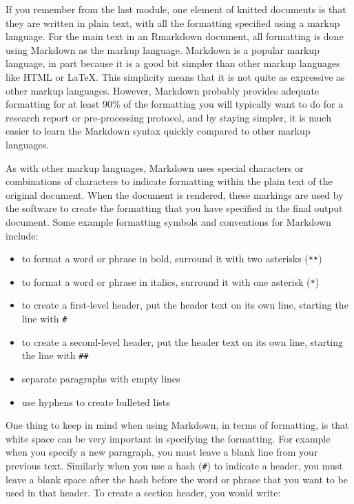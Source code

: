 \documentclass[]{tufte-book}
\providecommand{\tightlist}{%
  \setlength{\itemsep}{0pt}\setlength{\parskip}{0pt}}
\begin{document}
If you remember from the last module, one element of knitted documents is
that they are written in plain text, with all the formatting specified
using a markup language.
For the main text in an Rmarkdown document, all formatting is done using
Markdown as the markup language. Markdown is a popular markup language, in part
because it is a good bit simpler than other markup languages like HTML or LaTeX.
This simplicity means that it is not quite as expressive as other markup
languages. However, Markdown probably provides adequate formatting for at least 90\% of the
formatting you will typically want to do for a research report or
pre-processing protocol, and by staying simpler, it is much easier to learn the
Markdown syntax quickly compared to other markup languages.

As with other markup languages, Markdown uses special characters or combinations of characters to indicate formatting within the plain text of the original document. When the document is rendered, these markings are used by the software to create the formatting that you have specified in the final output document. Some example formatting symbols and conventions for Markdown include:

\begin{itemize}
\tightlist
\item
  to format a word or phrase in bold, surround it with two asterisks (\texttt{**})
\item
  to format a word or phrase in italics, surround it with one asterisk (\texttt{*})
\item
  to create a first-level header, put the header text on its own line, starting the line with \texttt{\#}
\item
  to create a second-level header, put the header text on its own line, starting the line with \texttt{\#\#}
\item
  separate paragraphs with empty lines
\item
  use hyphens to create bulleted lists
\end{itemize}

One thing to keep in mind when using Markdown, in terms of formatting, is that
white space can be very important in specifying the formatting. For example when
you specify a new paragraph, you must leave a blank line from your previous
text. Similarly when you use a hash (\texttt{\#}) to indicate a header, you must leave a
blank space after the hash before the word or phrase that you want to be used in
that header. To create a section header, you would write:
\end{document}
